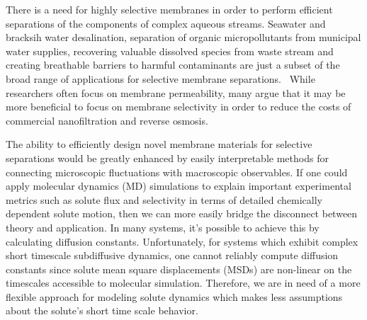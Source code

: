 \documentclass[journal=jpcbfk,manuscript=article]{achemso}
\begin{document}
  There is a need for highly selective membranes in order to perform efficient 
  separations of the components of complex aqueous streams. Seawater and
  bracksih water desalination, separation of organic micropollutants from 
  municipal water supplies, recovering valuable dissolved species from 
  waste stream and creating breathable barriers to harmful contaminants are just a
  subset of the broad range of applications for selective membrane separations.~\cite{fritzmann_state---art_2007,fonseca_couto_critical_2018,dischinger_evaluation_2019,ramaseshan_functionalized_2006}
  While researchers often focus on membrane permeability, many argue that
  it may be more beneficial to focus on membrane selectivity in order to 
  reduce the costs of commercial nanofiltration and reverse osmosis.~\cite{werber_materials_2016}
  
  The ability to efficiently design novel membrane materials for selective separations
  would be greatly enhanced by easily interpretable methods for connecting microscopic
  fluctuations with macroscopic observables. If one could apply molecular dynamics 
  (MD) simulations to explain important experimental metrics such as solute flux and 
  selectivity in terms of detailed chemically dependent solute motion, then we can more
  easily bridge the disconnect between theory and application. In many systems, it's 
  possible to achieve this by calculating diffusion constants. 
  Unfortunately, for 
  systems which exhibit complex short timescale subdiffusive dynamics, one cannot 
  reliably compute diffusion constants since solute mean square 
  displacements (MSDs) are non-linear on the timescales accessible to molecular simulation.
  Therefore, we are in need of a more flexible approach for modeling solute dynamics
  which makes less assumptions about the solute's short time scale behavior.
  
\end{document}
